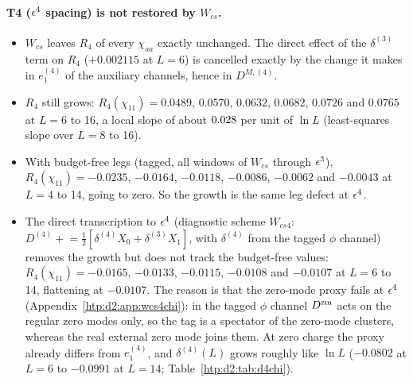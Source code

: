 \paragraph{T4 ($\epsilon^4$ spacing) is not restored by $W_{cs}$.}
\begin{itemize}
\item $W_{cs}$ leaves $R_4$ of every $\chi_{aa}$ exactly unchanged. The direct effect of the $\delta^{(3)}$ term on $R_4$
 ($+0.002115$ at $L=6$) is cancelled exactly by the change it makes in $e_1^{(4)}$ of the auxiliary channels, hence in
 $D^{M,(4)}$.
\item $R_4$ still grows: $R_4(\chi_{11})=0.0489$, $0.0570$, $0.0632$, $0.0682$, $0.0726$ and $0.0765$ at $L=6$ to 16, a local
 slope of about $0.028$ per unit of $\ln L$ (least-squares slope over $L=8$ to 16).
\item With budget-free legs (tagged, all windows of $W_{cs}$ through $\epsilon^3$), $R_4(\chi_{11})=-0.0235$, $-0.0164$, $-0.0118$,
 $-0.0086$, $-0.0062$ and $-0.0043$ at $L=4$ to 14, going to zero. So the growth is the same leg defect at $\epsilon^4$.
\item The direct transcription to $\epsilon^4$ (diagnostic scheme $W_{cs4}$: $D^{(4)}\mathrel{+}=\frac12[\delta^{(4)}X_0+\delta^{(3)}X_1]$,
 with $\delta^{(4)}$ from the tagged $\phi$ channel) removes the growth but does not track the budget-free values:
 $R_4(\chi_{11})=-0.0165$, $-0.0133$, $-0.0115$, $-0.0108$ and $-0.0107$ at $L=6$ to 14, flattening at $-0.0107$. The
 reason is that the zero-mode proxy fails at $\epsilon^4$ (Appendix~\ref{htp:d2:app:wcs4chi}): in the tagged $\phi$ channel $D^{\rm zm}$
 acts on the regular zero modes only, so the tag is a spectator of the zero-mode clusters, whereas the real external zero mode
 joins them. At zero charge the proxy already differs from $e_1^{(4)}$, and $\delta^{(4)}(L)$ grows roughly like $\ln L$ ($-0.0802$
 at $L=6$ to $-0.0991$ at $L=14$; Table~\ref{htp:d2:tab:d4chi}).
\end{itemize}

